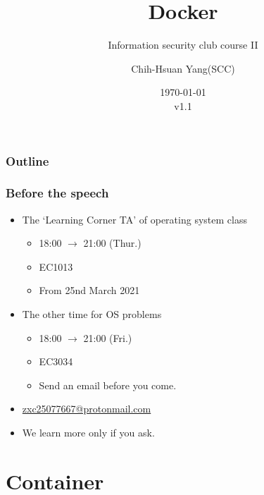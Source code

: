 \documentclass{beamer}
\title{Docker}
\subtitle{Information security club course \RN{2}}
\author{Chih-Hsuan Yang(SCC)}
\institute{National Sun Yat-sen University}
\date{\today\\v1.1}
\begin{document}
\begin{frame}
    \titlepage
\end{frame}

\begin{frame}
    \frametitle{Outline}
    \begin{multicols}{2}
        \tableofcontents
    \end{multicols}
\end{frame}

\begin{frame}
    \frametitle{Before the speech}
    \begin{itemize}
        \item The `Learning Corner TA' of operating system class
              \begin{itemize}
                  \item 18:00 $\to$ 21:00 (Thur.)
                  \item EC1013
                  \item From 25nd March 2021
              \end{itemize}
        \item The other time for OS problems
              \begin{itemize}
                  \item 18:00 $\to$ 21:00 (Fri.)
                  \item EC3034
                  \item Send an email before you come.
              \end{itemize}
        \item {\color{blue}\href{mailto::zxc25077667@protonmail.com}{zxc25077667@protonmail.com}}
        \item We learn more only if you ask.
    \end{itemize}
\end{frame}

\section{Container}
\end{document}
